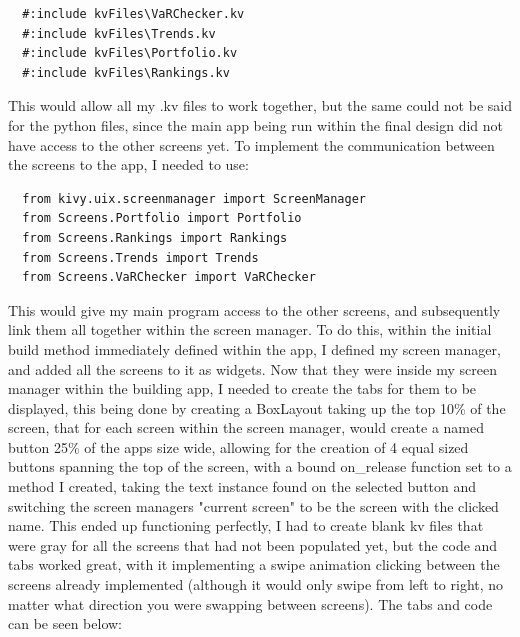 \documentclass{article}
\begin{document}
\begin{verbatim}
  #:include kvFiles\VaRChecker.kv
  #:include kvFiles\Trends.kv
  #:include kvFiles\Portfolio.kv
  #:include kvFiles\Rankings.kv
\end{verbatim}

\vspace{0.3cm}
This would allow all my .kv files to work together, but the same could not be said for the python files, since the main app being run within the final design did not have access to the other screens yet. To implement the communication between the screens to the app, I needed to use: \\\vspace{0.3cm}

\begin{verbatim}
  from kivy.uix.screenmanager import ScreenManager
  from Screens.Portfolio import Portfolio
  from Screens.Rankings import Rankings
  from Screens.Trends import Trends
  from Screens.VaRChecker import VaRChecker

\end{verbatim}

This would give my main program access to the other screens, and subsequently link them all together within the screen manager. To do this, within the initial build method immediately defined within the app, I defined my screen manager, and added all the screens to it as widgets. Now that they were inside my screen manager within the building app, I needed to create the tabs for them to be displayed, this being done by creating a BoxLayout taking up the top 10\% of the screen, that for each screen within the screen manager, would create a named button 25\% of the apps size wide, allowing for the creation of 4 equal sized buttons spanning the top of the screen, with a bound on\_release function set to a method I created, taking the text instance found on the selected button and switching the screen managers "current screen" to be the screen with the clicked name. This ended up functioning perfectly, I had to create blank kv files that were gray for all the screens that had not been populated yet, but the code and tabs worked great, with it implementing a swipe animation clicking between the screens already implemented (although it would only swipe from left to right, no matter what direction you were swapping between screens). The tabs and code can be seen below:\\\vspace{0.3cm}
\end{document}
